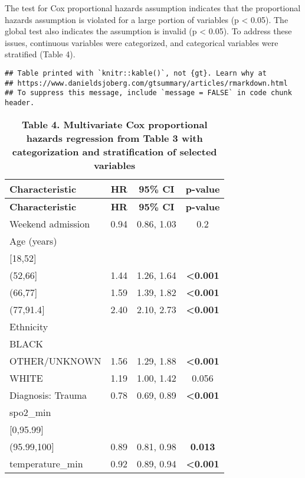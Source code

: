 \documentclass[
]{article}
\begin{document}
The test for Cox proportional hazards assumption indicates that the
proportional hazards assumption is violated for a large portion of
variables (p \textless{} 0.05). The global test also indicates the
assumption is invalid (p \textless{} 0.05). To address these issues,
continuous variables were categorized, and categorical variables were
stratified (Table 4).

\begin{verbatim}
## Table printed with `knitr::kable()`, not {gt}. Learn why at
## https://www.danieldsjoberg.com/gtsummary/articles/rmarkdown.html
## To suppress this message, include `message = FALSE` in code chunk header.
\end{verbatim}

\begin{longtable}[]{@{}lccc@{}}
\caption{\textbf{Table 4. Multivariate Cox proportional hazards
regression from Table 3 with categorization and stratification of
selected variables}}\tabularnewline
\toprule\noalign{}
\textbf{Characteristic} & \textbf{HR} & \textbf{95\% CI} &
\textbf{p-value} \\
\midrule\noalign{}
\endfirsthead
\toprule\noalign{}
\textbf{Characteristic} & \textbf{HR} & \textbf{95\% CI} &
\textbf{p-value} \\
\midrule\noalign{}
\endhead
\bottomrule\noalign{}
\endlastfoot
Weekend admission & 0.94 & 0.86, 1.03 & 0.2 \\
Age (years) & & & \\
{[}18,52{]} & & & \\
(52,66{]} & 1.44 & 1.26, 1.64 & \textbf{\textless0.001} \\
(66,77{]} & 1.59 & 1.39, 1.82 & \textbf{\textless0.001} \\
(77,91.4{]} & 2.40 & 2.10, 2.73 & \textbf{\textless0.001} \\
Ethnicity & & & \\
BLACK & & & \\
OTHER/UNKNOWN & 1.56 & 1.29, 1.88 & \textbf{\textless0.001} \\
WHITE & 1.19 & 1.00, 1.42 & 0.056 \\
Diagnosis: Trauma & 0.78 & 0.69, 0.89 & \textbf{\textless0.001} \\
spo2\_min & & & \\
{[}0,95.99{]} & & & \\
(95.99,100{]} & 0.89 & 0.81, 0.98 & \textbf{0.013} \\
temperature\_min & 0.92 & 0.89, 0.94 & \textbf{\textless0.001} \\

\end{longtable}
\end{document}
